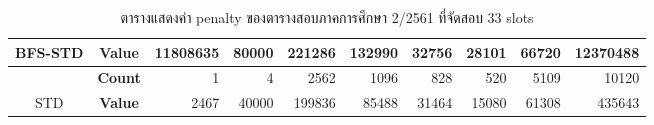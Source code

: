 \begin{table}[]
{\begin{tabular}{@{}ccrrrrrrrr@{}}
    \multirow{-2}{*}{BFS-STD}                    & \textbf{Value}                        & 11808635                       & 80000                          & 221286                         & 132990                         & 32756                          & 28101                          & 66720                          & 12370488                         \\ \midrule
                                                  & {\textbf{Count}} & {1}       & {4}       & {2562}    & {1096}    & {828}     & {520}     & {5109}    & {10120}     \\ \cmidrule(l){2-10} 
    \multirow{-2}{*}{STD} & {\textbf{Value}} & {2467}    & {40000}   & {199836}  & {85488}   & {31464}   & {15080}   & {61308}   & {435643}    \\ \bottomrule
    \end{tabular}%
    }
    \caption{ตารางแสดงค่า penalty ของตารางสอบภาคการศึกษา 2/2561 ที่จัดสอบ 33 slots}
    \label{tab:result_table_261_33}
\end{table}
